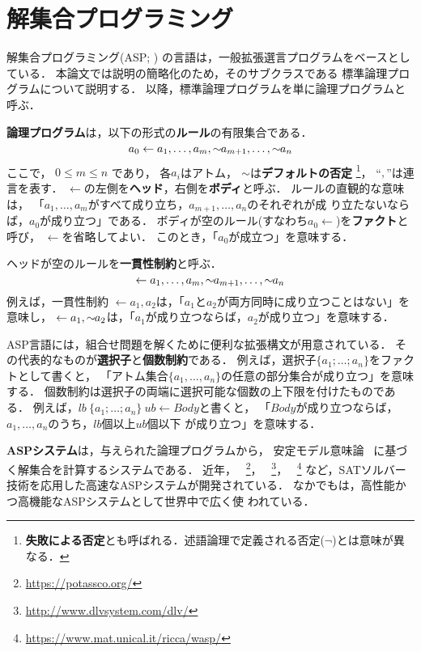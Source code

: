 \chapter{解集合プログラミング}\label{chap:asp}

解集合プログラミング(ASP; \cite{%
  Baral03:cambridge,%
  Gelfond88:iclp,%
  Niemela99:amai,%
  Inoue08:jssst})
の言語は，一般拡張選言プログラムをベースとしている．
本論文では説明の簡略化のため，そのサブクラスである
標準論理プログラムについて説明する．
以降，標準論理プログラムを単に論理プログラムと呼ぶ．

\textbf{論理プログラム}は，以下の形式の\textbf{ルール}の有限集合である．
\begin{equation}
  \label{eq:rule}
  a_0\leftarrow a_1,\dots,a_m,{\sim\!\!{a_{m+1}}},\dots,{\sim\!\!{a_n}}
\end{equation}
ここで，
$0\leq m\leq n$ であり，
各$a_i$はアトム，
${\sim\!\!{}}$は\textbf{デフォルトの否定}
\footnote{\textbf{失敗による否定}とも呼ばれる．述語論理で定義される否定($\neg$)とは意味が異なる．}，
``$,$''は連言を表す．
$\leftarrow$の左側を\textbf{ヘッド}，右側を\textbf{ボディ}と呼ぶ．
ルールの直観的な意味は，
「$a_1,\ldots,a_m$がすべて成り立ち，$a_{m+1},\ldots,a_n$のそれぞれが成
り立たないならば，$a_0$が成り立つ」である．
ボディが空のルール(すなわち\(a_0\leftarrow\))を\textbf{ファクト}と呼び，
$\leftarrow$を省略してよい．
このとき，「$a_0$が成立つ」を意味する．

ヘッドが空のルールを\textbf{一貫性制約}と呼ぶ．
\begin{equation}
  \label{eq:constr}
  \leftarrow a_1,\dots,a_m,{\sim\!\!{a_{m+1}}},\dots,{\sim\!\!{a_n}}
\end{equation}
例えば，一貫性制約
\(\leftarrow a_1,a_2\)は，「$a_1$と$a_2$が両方同時に成り立つことはない」を意味し，
\(\leftarrow a_1, {\sim\!\!{a_{2}}}\)は，「$a_1$が成り立つならば，$a_2$が成り立つ」を意味する．

ASP言語には，組合せ問題を解くために便利な拡張構文が用意されている．
その代表的なものが\textbf{選択子}と\textbf{個数制約}である．
例えば，選択子\(\{a_1;\dots;a_n\}\)をファクトとして書くと，
「アトム集合\(\{a_1,\dots,a_n\}\)の任意の部分集合が成り立つ」を意味する．
個数制約は選択子の両端に選択可能な個数の上下限を付けたものである．
例えば，\(lb\ \{a_1;\dots;a_n\}\ ub \leftarrow Body\)と書くと，
「$Body$が成り立つならば，$a_1,\dots,a_n$のうち，$lb$個以上$ub$個以下
が成り立つ」を意味する．

\textbf{ASPシステム}は，与えられた論理プログラムから，
安定モデル意味論~\cite{Gelfond88:iclp}
に基づく解集合を計算するシステムである．
近年，
{\clingo}~\footnote{\url{https://potassco.org/}}，
{\dlv}~\footnote{\url{http://www.dlvsystem.com/dlv/}}，
{\wasp}~\footnote{\url{https://www.mat.unical.it/ricca/wasp/}}
など，SATソルバー技術を応用した高速なASPシステムが開発されている．
なかでも{\clingo}は，高性能かつ高機能なASPシステムとして世界中で広く使
われている．

